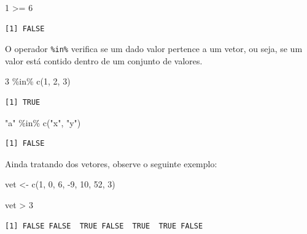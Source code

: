 \documentclass[
  brazilian,
]{book}
\newenvironment{Shaded}{\begin{snugshade}}{\end{snugshade}}
\newcommand{\DecValTok}[1]{\textcolor[rgb]{0.00,0.00,0.81}{#1}}
\newcommand{\FunctionTok}[1]{\textcolor[rgb]{0.00,0.00,0.00}{#1}}
\newcommand{\NormalTok}[1]{#1}
\newcommand{\OtherTok}[1]{\textcolor[rgb]{0.56,0.35,0.01}{#1}}
\newcommand{\SpecialCharTok}[1]{\textcolor[rgb]{0.00,0.00,0.00}{#1}}
\newcommand{\StringTok}[1]{\textcolor[rgb]{0.31,0.60,0.02}{#1}}
\begin{document}
\begin{Shaded}
\begin{Highlighting}[]
\DecValTok{1} \SpecialCharTok{\textgreater{}=} \DecValTok{6}
\end{Highlighting}
\end{Shaded}

\begin{verbatim}
[1] FALSE
\end{verbatim}

O operador \texttt{\%in\%} verifica se um dado valor pertence a um vetor, ou seja, se um valor está contido dentro de um conjunto de valores.

\begin{Shaded}
\begin{Highlighting}[]
\DecValTok{3} \SpecialCharTok{\%in\%} \FunctionTok{c}\NormalTok{(}\DecValTok{1}\NormalTok{, }\DecValTok{2}\NormalTok{, }\DecValTok{3}\NormalTok{)}
\end{Highlighting}
\end{Shaded}

\begin{verbatim}
[1] TRUE
\end{verbatim}

\begin{Shaded}
\begin{Highlighting}[]
\StringTok{"a"} \SpecialCharTok{\%in\%} \FunctionTok{c}\NormalTok{(}\StringTok{"x"}\NormalTok{, }\StringTok{"y"}\NormalTok{)}
\end{Highlighting}
\end{Shaded}

\begin{verbatim}
[1] FALSE
\end{verbatim}

Ainda tratando dos vetores, observe o seguinte exemplo:

\begin{Shaded}
\begin{Highlighting}[]
\NormalTok{vet }\OtherTok{\textless{}{-}} \FunctionTok{c}\NormalTok{(}\DecValTok{1}\NormalTok{, }\DecValTok{0}\NormalTok{, }\DecValTok{6}\NormalTok{, }\SpecialCharTok{{-}}\DecValTok{9}\NormalTok{, }\DecValTok{10}\NormalTok{, }\DecValTok{52}\NormalTok{, }\DecValTok{3}\NormalTok{)}

\NormalTok{vet }\SpecialCharTok{\textgreater{}} \DecValTok{3}
\end{Highlighting}
\end{Shaded}

\begin{verbatim}
[1] FALSE FALSE  TRUE FALSE  TRUE  TRUE FALSE
\end{verbatim}
\end{document}
